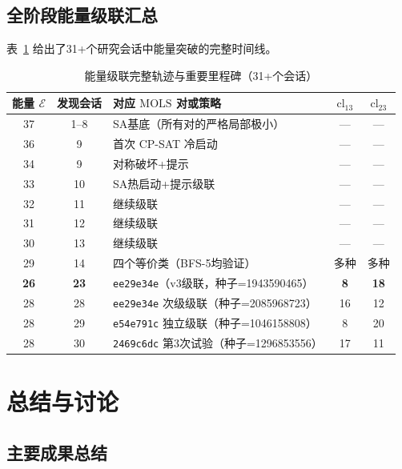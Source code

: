 \documentclass[11pt,a4paper]{ctexart}
\theoremstyle{remark}
\newcommand{\cl}{\mathrm{cl}}
\newcommand{\E}{\mathcal{E}}
\newcommand{\MOLS}{\mathrm{MOLS}}
\begin{document}
\subsection{全阶段能量级联汇总}

表~\ref{tab:all-results} 给出了31+个研究会话中能量突破的完整时间线。

\begin{table}[htbp]
  \centering
  \caption{能量级联完整轨迹与重要里程碑（31+个会话）}
  \label{tab:all-results}
  \begin{tabular}{cclcc}
    \toprule
    能量 $\E$ & 发现会话 & 对应 $\MOLS$ 对或策略 & $\cl_{13}$ & $\cl_{23}$ \\
    \midrule
    37 & 1--8  & SA基底（所有对的严格局部极小） & --- & --- \\
    36 & 9     & 首次 CP-SAT 冷启动 & --- & --- \\
    34 & 9     & 对称破坏+提示 & --- & --- \\
    33 & 10    & SA热启动+提示级联 & --- & --- \\
    32 & 11    & 继续级联 & --- & --- \\
    31 & 12    & 继续级联 & --- & --- \\
    30 & 13    & 继续级联 & --- & --- \\
    29 & 14    & 四个等价类（BFS-5均验证） & 多种 & 多种 \\
    \textbf{26} & \textbf{23} & \texttt{ee29e34e}（v3级联，种子=1943590465） & \textbf{8} & \textbf{18} \\
    28 & 28    & \texttt{ee29e34e} 次级级联（种子=2085968723） & 16 & 12 \\
    28 & 29    & \texttt{e54e791c} 独立级联（种子=1046158808） & 8  & 20 \\
    28 & 30    & \texttt{2469c6dc} 第3次试验（种子=1296853556） & 17 & 11 \\
    \bottomrule
  \end{tabular}
\end{table}

\section{总结与讨论}
\label{sec:conclusion}

\subsection{主要成果总结}
\end{document}
